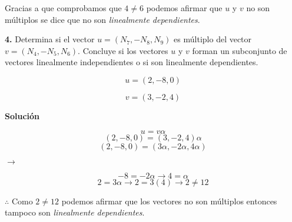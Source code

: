 \documentclass{article}
\begin{document}
Gracias a que comprobamos que $4 \neq 6$ podemos afirmar que $u$ y $v$ no son múltiplos se dice que no son \emph{linealmente dependientes}.
\vspace{10pt}


\textbf{4.} Determina si el vector $u=(N_7,-N_8,N_9)$ es múltiplo del vector $v=(N_4,-N_5,N_6)$. Concluye si los vectores $u$ y $v$ forman un subconjunto
de vectores linealmente independientes o si son linealmente dependientes.


\begin{minipage}[c]{0.5cm}
   $$u =(2, -8, 0)$$
\end{minipage}\hspace*{5cm}
\begin{minipage}[c]{0.5cm}
   $$v = (3, -2, 4)$$
\end{minipage}
\vspace{10pt}


\textbf{Solución}


\begin{minipage}[c]{0.5cm}
   $$u = v\alpha$$
   $$(2, -8, 0) = (3, -2, 4)\alpha$$
   $$(2, -8, 0) = (3\alpha, -2\alpha, 4\alpha)$$
\end{minipage}\hspace*{4cm}
$\rightarrow$\hspace*{1.5cm}
\begin{minipage}[c]{0.5cm}
   $$-8 = -2 \alpha \rightarrow 4 = \alpha$$
   $$2 =3\alpha \rightarrow 2 = 3(4) \rightarrow 2 \neq 12$$
\end{minipage}
\vspace{10pt}


$\therefore$ Como $2\neq 12$ podemos afirmar que los vectores no son múltiplos entonces tampoco son \emph{linealmente dependientes}.
\end{document}
